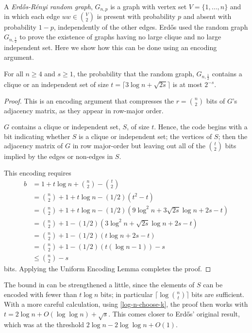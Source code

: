 \documentclass{patmorin}
\begin{document}
A \emph{Erd\H{o}s-R\'enyi random graph}, $G_{n,p}$ is a graph with vertex
set $V=\{1,\ldots,n\}$ and in which each edge $uw\in \binom{V}{2}$
is present with probability $p$ and absent with probability $1-p$,
independently of the other edges.  Erd\H{o}s \cite{erdos:some} used the random
graph $G_{n,\frac{1}{2}}$ to prove the existence of graphs having no
large clique and no large independent set. Here we show how this can be
done using an encoding argument.

\begin{thm}
  For all $n\ge 4$ and $s\ge 1$, the probability that the random graph,
  $G_{n,\frac{1}{2}}$ contains a clique or an independent set of size $t =
  \lceil 3\log n + \sqrt{2s}\rceil$ is at most $2^{-s}$.
\end{thm}

\begin{proof}
  This is an encoding argument that compresses the $r=\binom{n}{2}$
  bits of $G$'s adjacency matrix, as they appear in row-major order.
  
  $G$ contains a clique or independent set, $S$, of size $t$. Hence,
  the code begins with a bit indicating whether $S$ is a clique or
  independent set; the vertices of $S$; then the adjacency matrix of
  $G$ in row major-order but leaving out all of the $\binom{t}{2}$
  bits implied by the edges or non-edges in $S$.
  
  This encoding requires
  \begin{align*}
     b & = 1 + t\log n + \binom{n}{2}-\binom{t}{2} \\
       & = \binom{n}{2} + 1 + t\log n - (1/2)(t^2 - t) \\
       & = \binom{n}{2} + 1 + t\log n 
            - (1/2)\left(9\log^2 n +3\sqrt{2s}\log n + 2s - t\right) \\
       & = \binom{n}{2} + 1 
            - (1/2)\left(3\log^2 n + \sqrt{2s}\log n + 2s - t\right) \\
       & = \binom{n}{2} + 1 
            - (1/2)\left(t\log n + 2s - t\right) \\
       & = \binom{n}{2} + 1 
            - (1/2)\left(t(\log n-1)\right) - s \\
       & \le \binom{n}{2} - s 
  \end{align*}
  bits. Applying the Uniform Encoding Lemma completes the proof.
\end{proof}

\begin{rem}
  The bound in  can be strengthened a little,
  since the elements of $S$ can be encoded with fewer than $t\log n$
  bits; in particular $\lceil\log\binom{n}{t}\rceil$ bits are sufficient.
  With a more careful calculation, using \eqref{log-n-choose-k}, the
  proof then works with $t=2\log n +O(\log\log n) + \sqrt{s}$. This
  comes closer to Erdős' original result, which was at the threshold
  $2\log n - 2\log\log n + O(1)$.
\end{rem}
\end{document}
